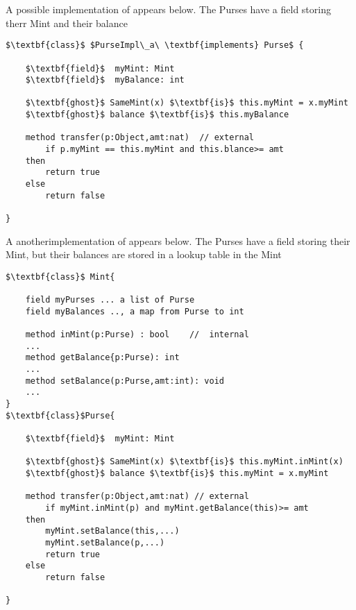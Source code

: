 A possible implementation of  appears below. The Purses have a field storing therr Mint and their balance

\begin{lstlisting}[mathescape=true, language=Chainmail, frame=lines]
$\textbf{class}$ $PurseImpl\_a\ \textbf{implements} Purse$ {
    
    $\textbf{field}$  myMint: Mint
    $\textbf{field}$  myBalance: int
     
    $\textbf{ghost}$ SameMint(x) $\textbf{is}$ this.myMint = x.myMint
    $\textbf{ghost}$ balance $\textbf{is}$ this.myBalance
    
    method transfer(p:Object,amt:nat)  // external
    	if p.myMint == this.myMint and this.blance>= amt 
	then
		return true
	else
		return false	
  
}
\end{lstlisting}

A anotherimplementation of  appears below. The Purses have a field storing their Mint, but their balances are stored in a 
lookup table in the Mint

\begin{lstlisting}[mathescape=true, language=Chainmail, frame=lines]
$\textbf{class}$ Mint{

	field myPurses ... a list of Purse
	field myBalances .., a map from Purse to int
	
	method inMint(p:Purse) : bool    //  internal
	...	
	method getBalance{p:Purse): int
	...
	method setBalance(p:Purse,amt:int): void
	...	
}
$\textbf{class}$Purse{
    
    $\textbf{field}$  myMint: Mint
     
    $\textbf{ghost}$ SameMint(x) $\textbf{is}$ this.myMint.inMint(x)
    $\textbf{ghost}$ balance $\textbf{is}$ this.myMint = x.myMint
    
    method transfer(p:Object,amt:nat) // external 
    	if myMint.inMint(p) and myMint.getBalance(this)>= amt 
	then
		myMint.setBalance(this,...)
		myMint.setBalance(p,...)
		return true
	else
		return false	
  
}
\end{lstlisting}



